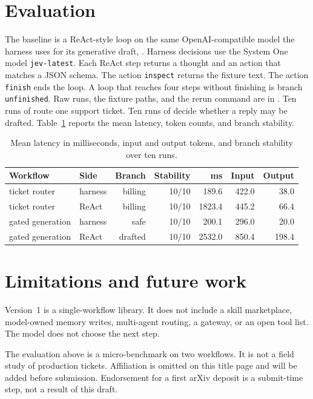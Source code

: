\documentclass[11pt]{article}
\begin{document}
\section{Evaluation}
\label{sec:evaluation}

The baseline is a ReAct-style loop on the same OpenAI-compatible model the
harness uses for its generative draft, .
Harness decisions use the System One model \texttt{jev-latest}.
Each ReAct step returns a thought and an action that matches a JSON schema.
The action \texttt{inspect} returns the fixture text.
The action \texttt{finish} ends the loop.
A loop that reaches four steps without finishing is branch \texttt{unfinished}.
Raw runs, the fixture paths, and the rerun command are in
.
Ten runs of  route one
support ticket.
Ten runs of  decide whether
a reply may be drafted.
Table~\ref{tab:eval} reports the mean latency, token counts, and branch
stability.

\begin{table}[t]
\centering
\caption{Mean latency in milliseconds, input and output tokens, and branch
stability over ten runs.}
\label{tab:eval}
{\footnotesize
\begin{tabular}{@{}llrrrrr@{}}
\toprule
Workflow & Side & Branch & Stability & ms & Input & Output \\
\midrule
ticket router & harness & billing & 10/10 & 189.6 & 422.0 & 38.0 \\
ticket router & ReAct & billing & 10/10 & 1823.4 & 445.2 & 66.4 \\
gated generation & harness & safe & 10/10 & 200.1 & 296.0 & 20.0 \\
gated generation & ReAct & drafted & 10/10 & 2532.0 & 850.4 & 198.4 \\
\bottomrule
\end{tabular}}
\end{table}

\section{Limitations and future work}
\label{sec:limits}

Version~1 is a single-workflow library. It does not include a skill
marketplace, model-owned memory writes, multi-agent routing, a gateway, or an
open tool list. The model does not choose the next step.

The evaluation above is a micro-benchmark on two workflows.
It is not a field study of production tickets. Affiliation is omitted on this
title page and will be added before submission. Endorsement for a first arXiv
deposit is a submit-time step, not a result of this draft.
\end{document}
